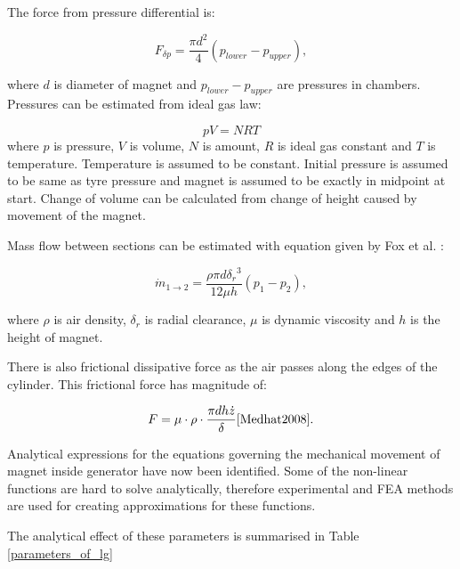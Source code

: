 The force from pressure differential is:

\begin{equation}
  F_{\delta p} = \frac{\pi d^2}{4}(p_{lower}-p_{upper}),
\end{equation}

where $d$ is diameter of magnet and $p_{lower}-p_{upper}$ are pressures in chambers. Pressures can be estimated from ideal gas law:

\begin{equation}
  pV = NRT
\end{equation}
where $p$ is pressure, $V$ is volume, $N$ is amount, $R$ is ideal gas constant and $T$ is temperature. Temperature is assumed to be constant. Initial pressure is assumed to be same as tyre pressure and magnet is assumed to be exactly in midpoint at start. Change of volume can be calculated from change of height caused by movement of the magnet. 

Mass flow between sections can be estimated with equation given by Fox et al. \cite{Fox2008}:

\begin{equation}
  \dot{m}_{1 \rightarrow 2} = \frac{\rho \pi d {\delta_r}^3}{12\mu h}(p_1-p_2),
\end{equation}

where $\rho$ is air density, $\delta_r$ is radial clearance, $\mu$ is dynamic viscosity and $h$ is the height of magnet. \cite{Tornincasa2012}

There is also frictional dissipative force as the air passes along the edges of the cylinder. This frictional force has magnitude of: 

\begin{equation}
  F = \mu \cdot \rho \cdot \frac{\pi d h \dot{z}}{\delta} \cite{Medhat2008}. 
\end{equation}

Analytical expressions for the equations governing the mechanical movement of magnet inside generator have now been identified. Some of the non-linear functions are hard to solve analytically, therefore experimental and FEA methods are used for creating approximations for these functions.

The analytical effect of these parameters is summarised in Table \ref{parameters_of_lg}

